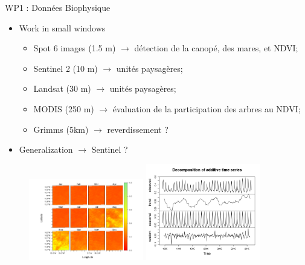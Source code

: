 \documentclass[newPxFont]{beamer}
\begin{document}

\begin{frame}[c]{WP1 : Données Biophysique}
\vspace{-2em}
\begin{itemize}
  \item Work in small windows
  \begin{itemize}
    \item Spot 6 images (1.5 m) $\rightarrow$ détection de la canopé, des mares, et NDVI;
    \item Sentinel 2 (10 m) $\rightarrow$ unités paysagères;
    \item Landsat (30 m) $\rightarrow$ unités paysagères;
    \item MODIS (250 m) $\rightarrow$ évaluation de la participation des arbres au NDVI;
    \item Grimms (5km) $\rightarrow$ reverdissement ?
  \end{itemize}
  \item Generalization $\rightarrow$ Sentinel ?
\end{itemize}
\vspace{-1em}
\begin{figure}
	\centering
	\includegraphics[width = 5cm]{img/NDVI2015}
  \includegraphics[width = 5cm]{img/reverdiement}
\end{figure}
\end{frame}
\end{document}
